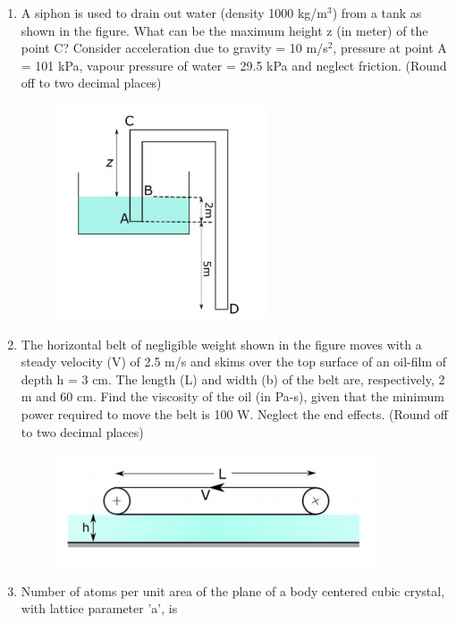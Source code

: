 \documentclass[a4paper,10pt]{article}
\begin{document}
\begin{enumerate}
\hfill{}

\item A siphon is used to drain out water (density 1000 kg/m$^3$) from a tank as shown in the figure. What can be the maximum height z (in meter) of the point C? Consider acceleration due to gravity = 10 m/s$^2$, pressure at point A = 101 kPa, vapour pressure of water = 29.5 kPa and neglect friction.
(Round off to two decimal places)
\begin{figure}[H]
    \centering
    \includegraphics[width=0.3\columnwidth]{q42.png}
    \caption*{}
    \label{fig:q42}
\end{figure}

\hfill{}

\item The horizontal belt of negligible weight shown in the figure moves with a steady velocity (V) of 2.5 m/s and skims over the top surface of an oil-film of depth h = 3 cm. The length (L) and width (b) of the belt are, respectively, 2 m and 60 cm. Find the viscosity of the oil (in Pa-s), given that the minimum power required to move the belt is 100 W. Neglect the end effects.
(Round off to two decimal places)
\begin{figure}[H]
    \centering
    \includegraphics[width=0.5\columnwidth]{q43.png}
    \caption*{}
    \label{fig:q43}
\end{figure}

\hfill{}

\item Number of atoms per unit area of the  plane of a body centered cubic crystal, with lattice parameter 'a', is

\hfill{}
\begin{enumerate}
\end{enumerate}


\end{enumerate}
\end{document}

